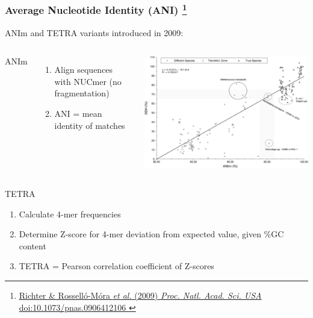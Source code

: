 %
\begin{frame}
  \frametitle{Average Nucleotide Identity (ANI)
  \footnote{\tiny{\href{http://dx.doi.org/10.1073/pnas.0906412106
}{Richter \& Rossell\'{o}-M\'{o}ra \textit{et al.} (2009) \textit{Proc. Natl. Acad. Sci. USA} doi:10.1073/pnas.0906412106
}}}
  }
  ANIm and TETRA variants introduced in 2009:
  \begin{columns}[T] 
      \textcolor{RawSienna}{ANIm}
      \begin{enumerate}
        \item \textcolor{hutton_green}{Align sequences with NUCmer (no fragmentation)}
        \item \textcolor{hutton_purple}{ANI = mean identity of matches}
      \end{enumerate}
      \includegraphics[width=\textwidth]{images/anim_ddh_equiv}
  \end{columns}    
  \textcolor{RawSienna}{TETRA}
  \begin{enumerate}
    \item \textcolor{hutton_green}{Calculate 4-mer frequencies}
    \item \textcolor{hutton_blue}{Determine Z-score for 4-mer deviation from expected value, given \%GC content}
    \item \textcolor{hutton_purple}{TETRA = Pearson correlation coefficient of Z-scores}
  \end{enumerate}
\end{frame}